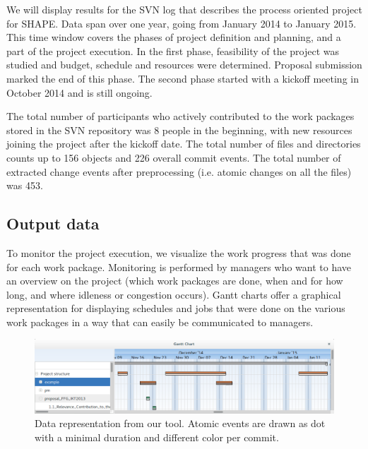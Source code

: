 We will display results for the SVN log that describes the process oriented project for SHAPE. Data span over one year, going from January 2014 to January 2015. This time window covers the phases of project definition and planning, and a part of the project execution. In the first phase, feasibility of the project was studied and budget, schedule and resources were determined. Proposal submission marked the end of this phase. The second phase started with a kickoff meeting in October 2014 and is still ongoing.

The total number of participants who actively contributed to the work packages stored in the SVN repository was 8 people in the beginning, with new resources joining the project after the kickoff date. The total number of files and directories counts up to 156 objects and 226 overall commit events. The total number of extracted change events after preprocessing (i.e. atomic changes on all the files) was 453.


\subsection{Output data}

To monitor the project execution, we visualize the work progress that was done for each work package. Monitoring is performed by managers who want to have an overview on the project (which work packages are done, when and for how long, and where idleness or congestion occurs). Gantt charts offer a graphical representation for displaying schedules and jobs that were done on the various work packages \citep{wilson2003gantt} in a way that can easily be communicated to managers.

\begin{figure}
\centering
\includegraphics[width=\textwidth]{bpm2015/imgs/aggregation_and_not}
\caption{Data representation from our tool. Atomic events are drawn as dot with a minimal duration and different color per commit. }
\label{fig:example-screenshot}
\end{figure}

